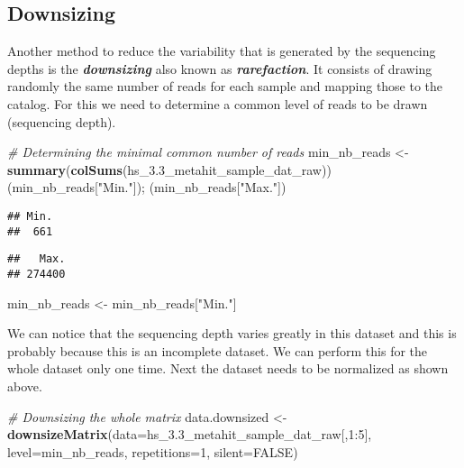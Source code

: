 \documentclass[]{article}
\newenvironment{Shaded}{\begin{snugshade}}{\end{snugshade}}
\newcommand{\KeywordTok}[1]{\textcolor[rgb]{0.13,0.29,0.53}{\textbf{{#1}}}}
\newcommand{\DataTypeTok}[1]{\textcolor[rgb]{0.13,0.29,0.53}{{#1}}}
\newcommand{\DecValTok}[1]{\textcolor[rgb]{0.00,0.00,0.81}{{#1}}}
\newcommand{\StringTok}[1]{\textcolor[rgb]{0.31,0.60,0.02}{{#1}}}
\newcommand{\CommentTok}[1]{\textcolor[rgb]{0.56,0.35,0.01}{\textit{{#1}}}}
\newcommand{\OtherTok}[1]{\textcolor[rgb]{0.56,0.35,0.01}{{#1}}}
\newcommand{\NormalTok}[1]{{#1}}
\begin{document}
\subsection{Downsizing}\label{downsizing}

Another method to reduce the variability that is generated by the
sequencing depths is the \textbf{\emph{downsizing}} also known as
\textbf{\emph{rarefaction}}. It consists of drawing randomly the same
number of reads for each sample and mapping those to the catalog. For
this we need to determine a common level of reads to be drawn
(sequencing depth).

\begin{Shaded}
\begin{Highlighting}[]
\CommentTok{# Determining the minimal common number of reads}
\NormalTok{min_nb_reads <-}\StringTok{ }\KeywordTok{summary}\NormalTok{(}\KeywordTok{colSums}\NormalTok{(hs_3.3_metahit_sample_dat_raw))}
\NormalTok{(min_nb_reads[}\StringTok{"Min."}\NormalTok{]); (min_nb_reads[}\StringTok{"Max."}\NormalTok{])}
\end{Highlighting}
\end{Shaded}

\begin{verbatim}
## Min. 
##  661
\end{verbatim}

\begin{verbatim}
##   Max. 
## 274400
\end{verbatim}

\begin{Shaded}
\begin{Highlighting}[]
\NormalTok{min_nb_reads <-}\StringTok{ }\NormalTok{min_nb_reads[}\StringTok{"Min."}\NormalTok{]}
\end{Highlighting}
\end{Shaded}

We can notice that the sequencing depth varies greatly in this dataset
and this is probably because this is an incomplete dataset. We can
perform this for the whole dataset only one time. Next the dataset needs
to be normalized as shown above.

\begin{Shaded}
\begin{Highlighting}[]
\CommentTok{# Downsizing the whole matrix}
\NormalTok{data.downsized <-}\StringTok{ }\KeywordTok{downsizeMatrix}\NormalTok{(}\DataTypeTok{data=}\NormalTok{hs_3.3_metahit_sample_dat_raw[,}\DecValTok{1}\NormalTok{:}\DecValTok{5}\NormalTok{], }
                                 \DataTypeTok{level=}\NormalTok{min_nb_reads, }\DataTypeTok{repetitions=}\DecValTok{1}\NormalTok{, }\DataTypeTok{silent=}\OtherTok{FALSE}\NormalTok{)}
\end{Highlighting}
\end{Shaded}
\end{document}
